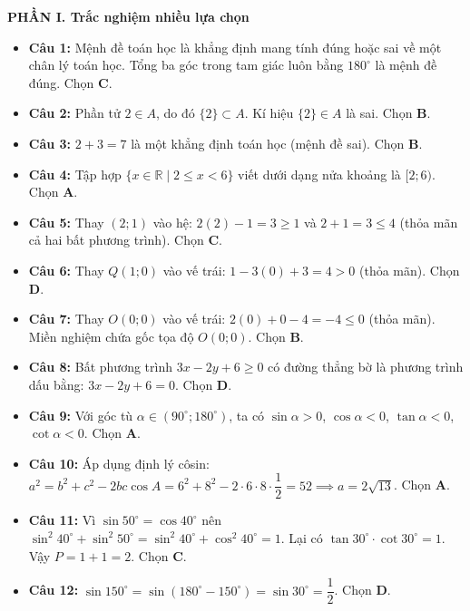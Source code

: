 \documentclass[12pt,a4paper]{article}
\begin{document}
\textbf{PHẦN I. Trắc nghiệm nhiều lựa chọn}
\begin{itemize}[leftmargin=0.6cm, itemsep=3pt]
    \item \textbf{Câu 1:} Mệnh đề toán học là khẳng định mang tính đúng hoặc sai về một chân lý toán học. Tổng ba góc trong tam giác luôn bằng $180^\circ$ là mệnh đề đúng. Chọn \textbf{C}.
    \item \textbf{Câu 2:} Phần tử $2 \in A$, do đó $\{2\} \subset A$. Kí hiệu $\{2\} \in A$ là sai. Chọn \textbf{B}.
    \item \textbf{Câu 3:} $2 + 3 = 7$ là một khẳng định toán học (mệnh đề sai). Chọn \textbf{B}.
    \item \textbf{Câu 4:} Tập hợp $\{x \in \mathbb{R} \mid 2 \le x < 6\}$ viết dưới dạng nửa khoảng là $[2; 6)$. Chọn \textbf{A}.
    \item \textbf{Câu 5:} Thay $(2; 1)$ vào hệ: $2(2) - 1 = 3 \ge 1$ và $2 + 1 = 3 \le 4$ (thỏa mãn cả hai bất phương trình). Chọn \textbf{C}.
    \item \textbf{Câu 6:} Thay $Q(1; 0)$ vào vế trái: $1 - 3(0) + 3 = 4 > 0$ (thỏa mãn). Chọn \textbf{D}.
    \item \textbf{Câu 7:} Thay $O(0; 0)$ vào vế trái: $2(0) + 0 - 4 = -4 \le 0$ (thỏa mãn). Miền nghiệm chứa gốc tọa độ $O(0; 0)$. Chọn \textbf{B}.
    \item \textbf{Câu 8:} Bất phương trình $3x - 2y + 6 \ge 0$ có đường thẳng bờ là phương trình dấu bằng: $3x - 2y + 6 = 0$. Chọn \textbf{D}.
    \item \textbf{Câu 9:} Với góc tù $\alpha \in (90^\circ; 180^\circ)$, ta có $\sin \alpha > 0$, $\cos \alpha < 0$, $\tan \alpha < 0$, $\cot \alpha < 0$. Chọn \textbf{A}.
    \item \textbf{Câu 10:} Áp dụng định lý côsin: $a^2 = b^2 + c^2 - 2bc \cos A = 6^2 + 8^2 - 2 \cdot 6 \cdot 8 \cdot \dfrac{1}{2} = 52 \implies a = 2\sqrt{13}$. Chọn \textbf{A}.
    \item \textbf{Câu 11:} Vì $\sin 50^\circ = \cos 40^\circ$ nên $\sin^2 40^\circ + \sin^2 50^\circ = \sin^2 40^\circ + \cos^2 40^\circ = 1$. Lại có $\tan 30^\circ \cdot \cot 30^\circ = 1$. Vậy $P = 1 + 1 = 2$. Chọn \textbf{C}.
    \item \textbf{Câu 12:} $\sin 150^\circ = \sin(180^\circ - 150^\circ) = \sin 30^\circ = \dfrac{1}{2}$. Chọn \textbf{D}.
\end{itemize}
\end{document}
